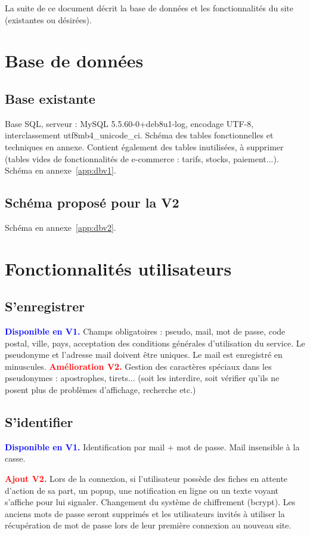 \documentclass[a4paper,10pt]{article}
\newcommand\existant[1]{\noindent\textbf{\textcolor{blue}{#1}}}
\newcommand\desire[1]{\noindent\textbf{\textcolor{red}{#1}}}
\begin{document}
La suite de ce document décrit la base de données et les fonctionnalités du site (existantes ou désirées).


\section{Base de données}
\subsection{Base existante}
Base SQL, serveur : MySQL 5.5.60-0+deb8u1-log, encodage UTF-8, interclassement utf8mb4\_unicode\_ci. Schéma des tables fonctionnelles et techniques en annexe. Contient également des tables inutilisées, à supprimer (tables vides de fonctionnalités de e-commerce : tarifs, stocks, paiement...). Schéma en annexe~\ref{app:dbv1}.

\subsection{Schéma proposé pour la V2}

Schéma en annexe~\ref{app:dbv2}.

\section{Fonctionnalités utilisateurs}
\subsection{S'enregistrer}

\existant{Disponible en V1.} Champs obligatoires : pseudo, mail, mot de passe, code postal, ville, pays, acceptation des conditions générales d'utilisation du service. Le pseudonyme et l'adresse mail doivent être uniques. Le mail est enregistré en minuscules. 
\desire{Amélioration V2.} Gestion des caractères spéciaux dans les pseudonymes : apostrophes, tirets... (soit les interdire, soit vérifier qu'ils ne posent plus de problèmes d'affichage, recherche etc.) 

\subsection{S'identifier}

\existant{Disponible en V1.} Identification par mail + mot de passe. Mail insensible à la casse.

\desire{Ajout V2.} Lors de la connexion, si l'utilisateur possède des fiches en attente d'action de sa part, un popup, une notification en ligne ou un texte voyant s'affiche pour lui signaler. Changement du système de chiffrement (bcrypt). Les anciens mots de passe seront supprimés et les utilisateurs invités à utiliser la récupération de mot de passe lors de leur première connexion au nouveau site.
\end{document}
